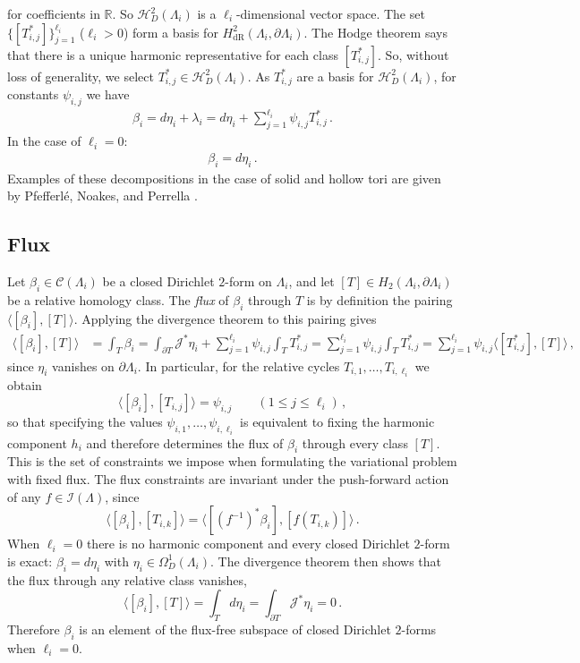 \documentclass[11pt]{article}
\theoremstyle{plain}
\theoremstyle{definition}
\theoremstyle{remark}
\newcommand{\R}{\mathbb{R}}
\newcommand{\ST}{\Lambda}
\newcommand{\C}{\mathcal{C} (\ST_i)}
\newcommand{\I}{\mathcal{I}(\ST)}
\newcommand{\h}{\mathcal{H}_D^2(\ST_i)}
\begin{document}
for coefficients in \(\R\). So \(\h\) is a \(\ell_i\)-dimensional vector space. The set \(\{ [T_{i,j}^*] \}_{j=1}^{\ell_i}\) (\(\ell_i > 0\)) form a basis for \( H^2_{\mathrm{dR}} (\ST_i, \partial \ST_i )\). The Hodge theorem says that there is a unique harmonic representative for each class \([T_{i,j}^*]\). So, without loss of generality, we select \(T_{i,j}^* \in \h \). As \(T_{i,j}^*\) are a basis for \(\h\), for constants \(\psi_{i,j}\) we have
\begin{align}
    \beta _i = d \eta_i + \lambda_i = d \eta_i + \sum_{j=1}^{\ell_i} \psi_{i,j} T_{i,j}^* \, . 
\end{align}
In the case of \(\ell_i = 0\):
\begin{align*}
    \beta _i = d \eta_i  \, . 
\end{align*}
Examples of these decompositions in the case of solid and hollow tori are given by Pfefferlé, Noakes, and Perrella \cite{Gauge_freedom}.




\subsection{Flux} \label{sub:flux}

Let \(\beta _i\in\C\) be a closed Dirichlet \(2\)-form on \(\ST_i\), and let \([T]\in H_2(\ST_i,\partial\ST_i)\) be a relative homology class. The \emph{flux} of \(\beta _i\) through \(T\) is by definition the pairing \(\langle[\beta _i],[T]\rangle\). Applying the divergence theorem to this pairing gives
\begin{align*}
\big\langle [\beta _i],[T]\big\rangle
&= \int_T \beta _i
= \int_{\partial T}\mathcal{J}^*\eta_i + \sum_{j=1}^{\ell_i}\psi_{i,j}\int_T T_{i,j}^*
= \sum_{j=1}^{\ell_i}\psi_{i,j}\int_T T_{i,j}^* =\sum_{j=1}^{\ell_i}\psi_{i,j}\big\langle [T_{i,j}^*],[T]\big\rangle \, ,
\end{align*}
since \(\eta_i\) vanishes on \(\partial\ST_i\). In particular, for the relative cycles \(T_{i,1},\dots,T_{i,\ell_i}\) we obtain
\[
\big\langle [\beta _i],[T_{i,j}]\big\rangle=\psi_{i,j}\qquad(1\le j\le\ell_i) \, ,
\]
so that specifying the values \(\psi_{i,1},\dots,\psi_{i,\ell_i}\) is equivalent to fixing the harmonic component \(h_i\) and therefore determines the flux of \(\beta _i\) through every class \([T]\). This is the set of constraints we impose when formulating the variational problem with fixed flux. The flux constraints are invariant under the push-forward action of any \(f\in\I\), since
\[
\big\langle[\beta _i],[T_{i,k}]\big\rangle
=\big\langle[(f^{-1})^* \beta _i],[f(T_{i,k})]\big\rangle \, .
\]
When \(\ell_i=0\) there is no harmonic component and every closed Dirichlet \(2\)-form is exact: \(\beta_i=d\eta_i\) with \(\eta_i\in\Omega^1_D(\ST_i)\). The divergence theorem then shows that the flux through any relative class vanishes,
\[
\langle[\beta _i],[T]\rangle=\int_T d\eta_i=\int_{\partial T}\mathcal{J}^*\eta_i=0 \, .
\]
Therefore \(\beta_i\) is an element of the flux-free subspace of closed Dirichlet \(2\)-forms when \(\ell_i=0\).
\end{document}
